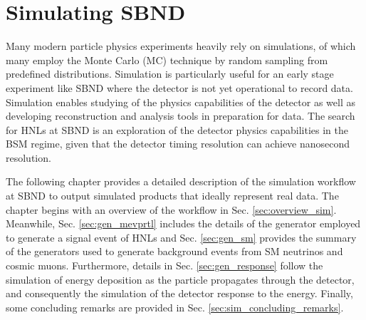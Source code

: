 
\chapter{Simulating SBND}
\label{ChapterSim}

\ifpdf
    \graphicspath{{Chapter6/Figs/Raster/}{Chapter6/Figs/PDF/}{Chapter6/Figs/}}
\else
    \graphicspath{{Chapter6/Figs/Vector/}{Chapter6/Figs/}}
\fi


Many modern particle physics experiments heavily rely on simulations, of which many employ the Monte Carlo (MC) technique by random sampling from predefined distributions.
Simulation is particularly useful for an early stage experiment like SBND where the detector is not yet operational to record data.
Simulation enables studying of the physics capabilities of the detector as well as developing reconstruction and analysis tools in preparation for data.
The search for HNLs at SBND is an exploration of the detector physics capabilities in the BSM regime, given that the detector timing resolution can achieve nanosecond resolution.

The following chapter provides a detailed description of the simulation workflow at SBND to output simulated products that ideally represent real data.
The chapter begins with an overview of the workflow in Sec. \ref{sec:overview_sim}.
Meanwhile, Sec. \ref{sec:gen_mevprtl} includes the details of the generator employed to generate a signal event of HNLs and Sec. \ref{sec:gen_sm} provides the summary of the generators used to generate background events from SM neutrinos and cosmic muons.
Furthermore, details in Sec. \ref{sec:gen_response} follow the simulation of energy deposition as the particle propagates through the detector, and consequently the simulation of the detector response to the energy.
Finally, some concluding remarks are provided in Sec. \ref{sec:sim_concluding_remarks}.

\newpage

